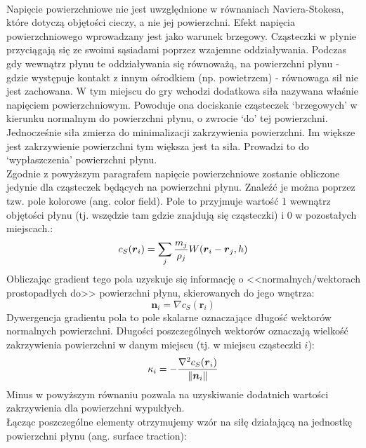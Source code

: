\paragraph{}
Napięcie powierzchniowe nie jest uwzględnione w równaniach Naviera-Stokesa, które dotyczą objętości cieczy, a nie jej powierzchni. Efekt napięcia powierzchniowego wprowadzany jest jako warunek brzegowy. Cząsteczki w płynie przyciągają się ze swoimi sąsiadami poprzez wzajemne oddziaływania. Podczas gdy wewnątrz płynu te oddziaływania się równoważą, na powierzchni płynu - gdzie występuje kontakt z innym ośrodkiem (np. powietrzem) - równowaga sił nie jest zachowana. W tym miejscu do gry wchodzi dodatkowa siła nazywana właśnie napięciem powierzchniowym. Powoduje ona dociskanie cząsteczek `brzegowych' w kierunku normalnym do powierzchni płynu, o zwrocie `do' tej powierzchni. Jednocześnie siła zmierza do minimalizacji zakrzywienia powierzchni. Im większe jest zakrzywienie powierzchni tym większa jest ta siła. Prowadzi to do `wypłaszczenia' powierzchni płynu.\\
Zgodnie z powyższym paragrafem napięcie powierzchniowe zostanie obliczone jedynie dla cząsteczek będących na powierzchni płynu. Znaleźć je można poprzez tzw. pole kolorowe (ang. color field). Pole to przyjmuje wartość 1 wewnątrz objętości płynu (tj. wszędzie tam gdzie znajdują się cząsteczki) i 0 w pozostałych miejscach.:
\begin{equation}
{c}_S(\boldsymbol{r}_i) = \sum\limits_{j} {m_j \over \rho_j} W(\boldsymbol{r}_i-\boldsymbol{r}_j, h)
\label{eqn:color_field}
\end{equation}
Obliczając gradient tego pola uzyskuje się informację o <<normalnych/wektorach prostopadłych do>> powierzchni płynu, skierowanych do jego wnętrza:
\begin{equation}
\boldsymbol{n}_i = \nabla{c}_S(\boldsymbol{r}_i)
\label{eqn:color_field_grad}
\end{equation}
Dywergencja gradientu pola to pole skalarne oznaczające długość wektorów normalnych powierzchni. Długości poszczególnych wektorów oznaczają wielkość zakrzywienia powierzchni w danym miejscu (tj. w miejscu cząsteczki $i$):
\begin{equation}
\kappa_i = -{\nabla^2{c}_S(\boldsymbol{r}_i) \over \|\boldsymbol{n}_i\|}
\label{eqn:color_field_div}
\end{equation}
Minus w powyższym równaniu pozwala na uzyskiwanie dodatnich wartości zakrzywienia dla powierzchni wypukłych.\\
Łącząc poszczególne elementy otrzymujemy wzór na siłę działającą na jednostkę powierzchni płynu (ang. surface traction):
